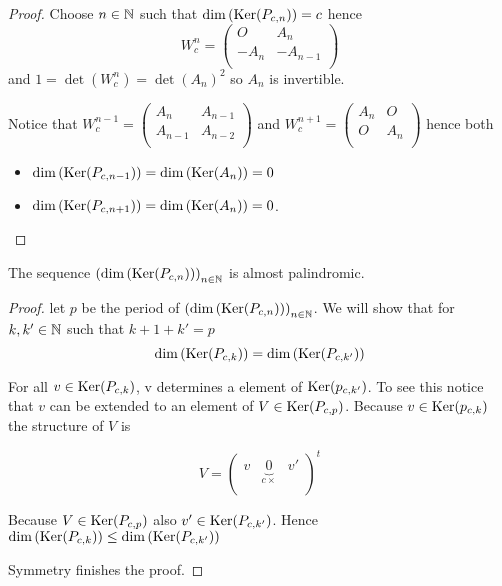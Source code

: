 \begin{proof}
  Choose $n\in\mathbb{N}$ such that $\dim\left(\operatorname{Ker}(P_{c,n})\right) = c$ hence
  \[
  W_{c}^{n}
  =
  \left(
  \begin{array}{cc}
     O    &  A_{n}  \\
    -A_{n} & -A_{n-1} \\
  \end{array}
  \right)
  \]
  and $1 = \det(W_{c}^{n}) = \det(A_{n})^{2}$ so $A_{n}$ is
  invertible.

  Notice that 
  $W_{c}^{n-1} = \left(\begin{smallmatrix} A_{n} & A_{n-1} \\A_{n-1} & A_{n-2} \\\end{smallmatrix}\right)$
  and
  $W_{c}^{n+1} = \left(\begin{smallmatrix} A_{n} & O \\ O & A_{n} \\\end{smallmatrix}\right)$
  hence both
  \begin{itemize}
    \item $\dim\left(\operatorname{Ker}(P_{c,n-1})\right) = \dim\left(\operatorname{Ker}(A_{n})\right) = 0$
    \item $\dim\left(\operatorname{Ker}(P_{c,n+1})\right) = \dim\left(\operatorname{Ker}(A_{n})\right) = 0$.
  \end{itemize}
\end{proof}

\begin{theorem}
  The sequence $\left(\dim\left(\operatorname{Ker}(P_{c,n})\right)\right)_{n\in\mathbb{N}}$
  is almost palindromic.
\end{theorem}

\begin{proof}
  let $p$ be the period of
  $\left(\dim\left(\operatorname{Ker}(P_{c,n})\right)\right)_{n\in\mathbb{N}}$. We will show
  that for $k,k'\in\mathbb{N}$ such that $k+1+k'=p$
  \[
  \dim\left(\operatorname{Ker}(P_{c,k})\right) = \dim\left(\operatorname{Ker}(P_{c,k'})\right)
  \]

  For all $v\in\operatorname{Ker}(P_{c,k})$, v determines a element of
  $\operatorname{Ker}(p_{c,k'})$. To see this notice that $v$ can be extended to an
  element of $V\in\operatorname{Ker}(P_{c,p})$. Because $v\in\operatorname{Ker}(p_{c,k})$ the
  structure of $V$ is
  
  \[
  V =
  \left(
  \begin{array}{ccc}
    v & \underbrace{0}_{c\times} & v' \\
  \end{array}
  \right)^{t}
  \]
  
  Because $V\in\operatorname{Ker}(P_{c,p})$ also
  $v'\in\operatorname{Ker}(P_{c,k'})$. Hence  $\dim\left(\operatorname{Ker}(P_{c,k})\right) \le
  \dim\left(\operatorname{Ker}(P_{c,k'})\right)$ 

  Symmetry finishes the proof.
\end{proof}
